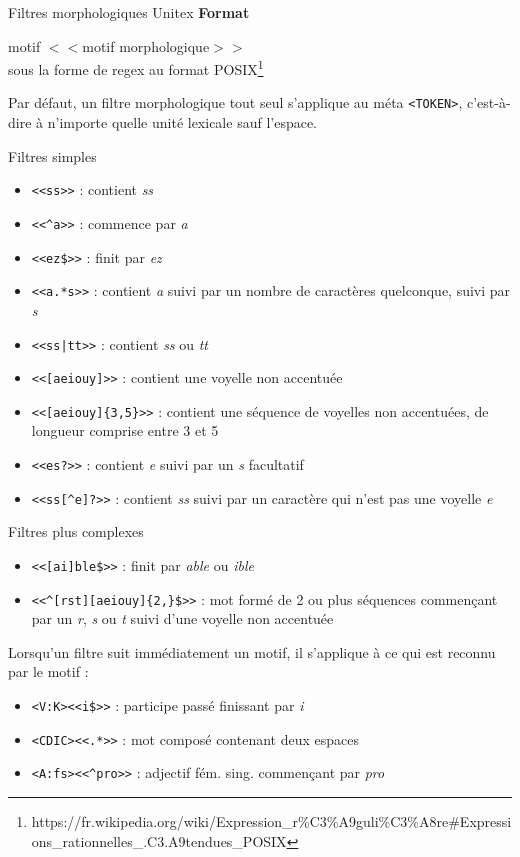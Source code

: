 \documentclass[xetex,xcolor={table,usenames,dvipsnames}]{beamer}
\newcommand{\bolder}[1]{{\color{purple}\bfseries#1}}
\begin{document}
\begin{frame}{Filtres morphologiques Unitex}
	\bolder{Format}
	
	motif $<<$motif morphologique$>>$\\
	sous la forme de regex au format \textsc{POSIX}\footnote{https://fr.wikipedia.org/wiki/Expression\_r\%C3\%A9guli\%C3\%A8re\#Expressions\_rationnelles\_.C3.A9tendues\_POSIX}
	
	Par défaut, un filtre morphologique tout seul s’applique au méta
	\texttt{<TOKEN>}, c’est-à-dire à n’importe quelle unité lexicale sauf l’espace.
\end{frame}

\begin{frame}{Filtres simples}
	\begin{itemize}
		\item \texttt{<<ss>>} : contient \textit{ss}
		\item \texttt{<<\^{}a>>} : commence par \textit{a}
		\item \texttt{<<ez\${}>>} : finit par \textit{ez}
		\item \texttt{<<a.*s>>} : contient \textit{a} suivi par un nombre de caractères quelconque, suivi par \textit{s}
		\item \texttt{<<ss|tt>>} : contient \textit{ss} ou \textit{tt}
		\item \texttt{<<[aeiouy]>>} : contient une voyelle non accentuée
		\item \texttt{<<[aeiouy]\{3,5\}>>} : contient une séquence de voyelles non accentuées, de longueur comprise entre 3 et 5
		\item \texttt{<<es?>>} : contient \textit{e} suivi par un \textit{s} facultatif
		\item \texttt{<<ss[\^{}e]?>>} : contient \textit{ss} suivi par un caractère qui n'est pas une voyelle \textit{e}
	\end{itemize}
\end{frame}

\begin{frame}{Filtres plus complexes}
	\begin{itemize}
		\item \texttt{<<[ai]ble\${}>>} : finit par \textit{able} ou \textit{ible}
		\item \texttt{<<\^{}[rst][aeiouy]\{2,\}\${}>>} : mot formé de 2 ou plus séquences commençant par un \textit{r}, \textit{s} ou \textit{t} suivi d'une voyelle non accentuée
	\end{itemize}
	
	Lorsqu'un filtre suit immédiatement un motif, il s'applique à ce qui est reconnu par le motif :
	\begin{itemize}
		\item \texttt{<V:K><<i\${}>>} : participe passé finissant par \textit{i}
		\item \texttt{<CDIC><<.*>>} : mot composé contenant deux espaces
		\item \texttt{<A:fs><<\^{}pro>>} : adjectif fém. sing. commençant par \textit{pro}
	\end{itemize}
\end{frame}
\end{document}
